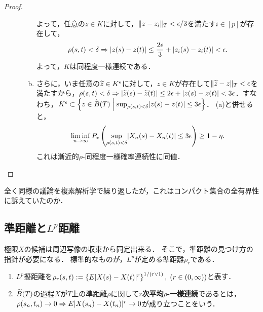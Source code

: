 \documentclass[uplatex,dvipdfmx]{jsreport}
\begin{document}
\begin{proof}
\begin{description}
\begin{enumerate}[(a)]
            よって，任意の$z\in K$に対して，$\|z-z_i\|_T<\epsilon/3$を満たす$i\in[p]$が存在して，
            \[\rho(s,t)<\delta\Rightarrow\lvert z(s)-z(t)\rvert\le\frac{2\epsilon}{3}+\lvert z_i(s)-z_i(t)\rvert<\epsilon.\]
            よって，$K$は同程度一様連続である．
            \item さらに，いま任意の$\widetilde{z}\in K^\epsilon$に対して，$z\in K$が存在して$\|\widetilde{z}-z\|_T<\epsilon$を満たすから，$\rho(s,t)<\delta\Rightarrow\lvert\widetilde{z}(s)-\widetilde{z}(t)\rvert\le 2\epsilon+\lvert z(s)-z(t)\rvert<3\epsilon$．すなわち，$K^\epsilon\subset\left\{z\in\widetilde{B}(T)\;\middle|\;\sup_{\rho(s,t)<\delta}\lvert z(s)-z(t)\rvert\le 3\epsilon\right\}$．
            (a)と併せると，
            \[\liminf_{n\to\infty} P_*\left(\sup_{\rho(s,t)<\delta}\lvert X_n(s)-X_n(t)\rvert\le 3\epsilon\right)\ge 1-\eta.\]
            これは漸近的$\rho$-同程度一様確率連続性に同値．
        \end{enumerate}
    \end{description}
\end{proof}
\begin{remarks}
    全く同様の議論を複素解析学で繰り返したが，これはコンパクト集合の全有界性に訴えていたのか．
\end{remarks}

\subsection{準距離と$L^p$距離}

\begin{tcolorbox}[colframe=ForestGreen, colback=ForestGreen!10!white,breakable,colbacktitle=ForestGreen!40!white,coltitle=black,fonttitle=\bfseries\sffamily,
title=]
    極限$X$の候補は周辺写像の収束から同定出来る．
    そこで，準距離の見つけ方の指針が必要になる．
    標準的なものが，$L^p$が定める準距離$\rho_r$である．
\end{tcolorbox}

\begin{definition}\mbox{}\label{def-rho-r}
    \begin{enumerate}
        \item $L^p$擬距離を$\rho_r(s,t):=\left\{E\lvert X(s)-X(t)\rvert^r\right\}^{1/(r\lor 1)},\;(r\in(0,\infty))$と表す．
        \item $\widetilde{B}(T)$の過程$X$が$T$上の準距離$\rho$に関して\textbf{$r$次平均$\rho$-一様連続}であるとは，$\rho(s_n,t_n)\to0\Rightarrow E\lvert X(s_n)-X(t_n)\rvert^r\to0$が成り立つことをいう．
    \end{enumerate}
\end{definition}
\end{document}
